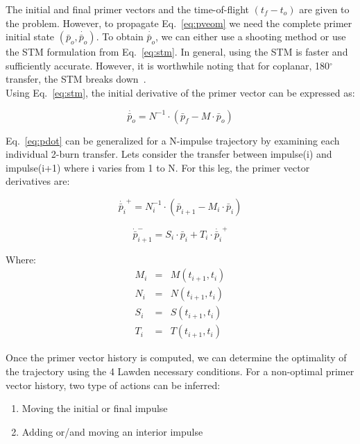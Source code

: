 \documentclass[12pt]{report}
\begin{document}
\noindent The initial and final primer vectors and the
time-of-flight $(t_{f}-t_{o})$ are given to the problem. However,
to propagate Eq.~\ref{eq:pveom} we need the complete primer
initial state $(\bar p_{o}, \dot{\bar p_{o}})$. To obtain
$\dot{\bar p_{o}}$, we can either use a shooting method or use the
STM formulation from Eq.~\ref{eq:stm}. In general, using the STM
is faster and sufficiently accurate. However, it is worthwhile
noting that for coplanar, 180$^{\circ}$ transfer, the STM breaks down~\cite{PrusCon}.\\
Using Eq.~\ref{eq:stm}, the initial derivative of the primer
vector can be expressed as:

\begin{equation}
\dot{\bar p_{o}} = N^{-1} \cdot (\bar p_{f} - M \cdot \bar p_{o})
\label{eq:pdot}
\end{equation}

\noindent Eq.~\ref{eq:pdot} can be generalized for a N-impulse
trajectory by examining each individual 2-burn transfer. Lets
consider the transfer between impulse(i) and impulse(i+1) where i
varies from 1 to N. For this leg, the primer vector derivatives
are:

\begin{equation}
\dot{\bar p_{i}}^{+} = N_{i}^{-1} \cdot (\bar p_{i+1} - M_{i}
\cdot \bar p_{i}) \label{eq:pdot2}
\end{equation}

\begin{equation}
\dot{\bar p}_{i+1}^{-} = S_{i} \cdot \bar p_{i} + T_{i} \cdot
\dot{\bar p_{i}}^{+} \label{eq:pdot3}
\end{equation}

\noindent Where:
\begin{eqnarray}
M_{i}& = & M(t_{i+1},t_{i}) \\
N_{i}& = & N(t_{i+1},t_{i})\nonumber\\
S_{i}& = & S(t_{i+1},t_{i})\nonumber\\
T_{i}& = & T(t_{i+1},t_{i}) \nonumber
\end{eqnarray}


\noindent Once the primer vector history is computed, we can
determine the optimality of the trajectory using the 4 Lawden
necessary conditions. For a non-optimal primer vector history, two
type of actions can be inferred:
\begin{enumerate}
\item Moving the initial or final impulse
\item Adding or/and moving an interior impulse
\end{enumerate}
\end{document}
